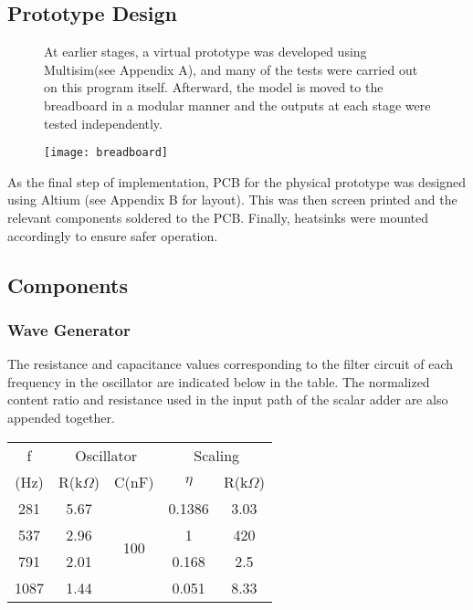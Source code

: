 \subsection{Prototype Design}
\begin{figure}[h]
    \begin{minipage}{.53\columnwidth}
        At earlier stages, a virtual prototype was developed using Multisim(see Appendix A), and many of the tests were carried out on this program itself. Afterward, the model is moved to the breadboard in a modular manner and the outputs at each stage were tested independently.
    \end{minipage}
    \begin{minipage}{.38\columnwidth}
        \texttt{[image: breadboard]}
    \end{minipage}
\end{figure}

As the final step of implementation, PCB for the physical prototype was designed using Altium (see Appendix B for layout). This was then screen printed and the relevant components soldered to the PCB. Finally, heatsinks were mounted accordingly to ensure safer operation.
\subsection{Components}
\subsubsection*{Wave Generator}
The resistance and capacitance values corresponding to the filter circuit of each frequency in the oscillator are indicated below in the table. The normalized content ratio and resistance used in the input path of the scalar adder are also appended together.
\begin{center}
    \begin{tabular}{|c|c|c|c|c|}
        \toprule
        f    & \multicolumn{2}{|c|}{Oscillator} & \multicolumn{2}{|c|}{Scaling}                         \\
        \cmidrule{2-5}
        (Hz) & R(k$\Omega$)                     & C(nF)                         & $\eta$ & R(k$\Omega$) \\
        \midrule
        281  & 5.67                             & \multirow{4}{*}{100}          & 0.1386 & 3.03         \\
        537  & 2.96                             &                               & 1      & 420          \\
        791  & 2.01                             &                               & 0.168  & 2.5          \\
        1087 & 1.44                             &                               & 0.051  & 8.33         \\
        \bottomrule
    \end{tabular}
\end{center}

